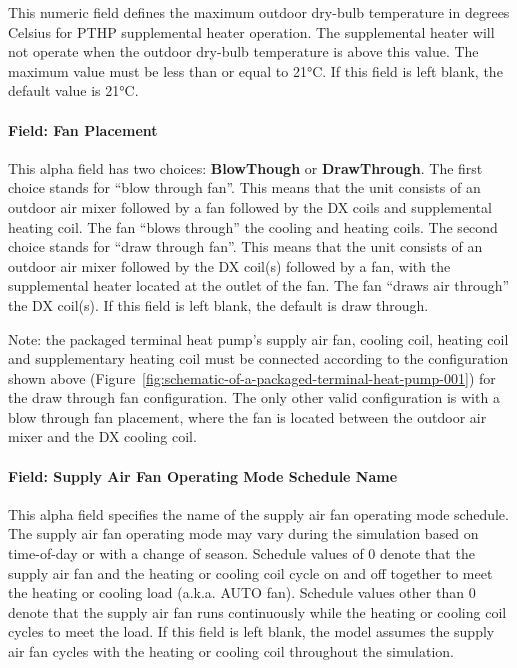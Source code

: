 This numeric field defines the maximum outdoor dry-bulb temperature in degrees Celsius for PTHP supplemental heater operation. The supplemental heater will not operate when the outdoor dry-bulb temperature is above this value. The maximum value must be less than or equal to 21°C. If this field is left blank, the default value is 21°C.

\paragraph{Field: Fan Placement}\label{field-fan-placement-4-000}

This alpha field has two choices: \textbf{BlowThough} or \textbf{DrawThrough}. The first choice stands for ``blow through fan''. This means that the unit consists of an outdoor air mixer followed by a fan followed by the DX coils and supplemental heating coil. The fan ``blows through'' the cooling and heating coils. The second choice stands for ``draw through fan''. This means that the unit consists of an outdoor air mixer followed by the DX coil(s) followed by a fan, with the supplemental heater located at the outlet of the fan. The fan ``draws air through'' the DX coil(s). If this field is left blank, the default is draw through.

Note: the packaged terminal heat pump's supply air fan, cooling coil, heating coil and supplementary heating coil must be connected according to the configuration shown above (Figure~\ref{fig:schematic-of-a-packaged-terminal-heat-pump-001}) for the draw through fan configuration. The only other valid configuration is with a blow through fan placement, where the fan is located between the outdoor air mixer and the DX cooling coil.

\paragraph{Field: Supply Air Fan Operating Mode Schedule Name}\label{field-supply-air-fan-operating-mode-schedule-name-5}

This alpha field specifies the name of the supply air fan operating mode schedule. The supply air fan operating mode may vary during the simulation based on time-of-day or with a change of season. Schedule values of 0 denote that the supply air fan and the heating or cooling coil cycle on and off together to meet the heating or cooling load (a.k.a. AUTO fan). Schedule values other than 0 denote that the supply air fan runs continuously while the heating or cooling coil cycles to meet the load. If this field is left blank, the model assumes the supply air fan cycles with the heating or cooling coil throughout the simulation.

